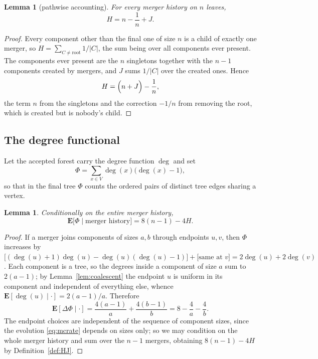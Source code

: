 \documentclass[10pt,a4paper]{amsart}
\newtheorem{lemma}[theorem]{Lemma}
\newcommand{\E}{\mathbf{E}}
\DeclareMathOperator{\dg}{deg}
\begin{document}
\begin{lemma}[pathwise accounting]
\label{lem:HJ}
For every merger history on $n$ leaves,
\[
H=n-\frac1n+J .
\]
\end{lemma}

\begin{proof}
Every component other than the final one of size $n$ is a child of exactly one
merger, so $H=\sum_{C\ne\text{root}}1/|C|$, the sum being over all components
ever present. The components ever present are the $n$ singletons together with
the $n-1$ components created by mergers, and $J$ sums $1/|C|$ over the created
ones. Hence
\[
H=\Bigl(n+J\Bigr)-\frac1n,
\]
the term $n$ from the singletons and the correction $-1/n$ from removing the
root, which is created but is nobody's child.
\end{proof}

\subsection{The degree functional}

Let the accepted forest carry the degree function $\dg$ and set
\[
\Phi=\sum_{x\in V}\dg(x)\bigl(\dg(x)-1\bigr),
\]
so that in the final tree $\Phi$ counts the ordered pairs of distinct tree edges
sharing a vertex.

\begin{lemma}
\label{lem:drift}
Conditionally on the entire merger history,
\begin{equation}
\label{eq:PhiH}
\E\bigl[\Phi\mid \text{merger history}\bigr]=8(n-1)-4H .
\end{equation}
\end{lemma}

\begin{proof}
If a merger joins components of sizes $a,b$ through endpoints $u,v$, then
$\Phi$ increases by
$\bigl[(\dg(u)+1)\dg(u)-\dg(u)(\dg(u)-1)\bigr]+\bigl[\text{same at }v\bigr]
=2\dg(u)+2\dg(v)$. Each component is a tree, so the degrees inside a component of
size $a$ sum to $2(a-1)$; by Lemma~\ref{lem:coalescent} the endpoint $u$ is
uniform in its component and independent of everything else, whence
$\E[\dg(u)\mid\cdot]=2(a-1)/a$. Therefore
\[
\E[\Delta\Phi\mid \cdot]=\frac{4(a-1)}a+\frac{4(b-1)}b=8-\frac4a-\frac4b .
\]
The endpoint choices are independent of the sequence of component sizes, since
the evolution \eqref{eq:mcrate} depends on sizes only; so we may condition on the
whole merger history and sum over the $n-1$ mergers, obtaining
$8(n-1)-4H$ by Definition~\ref{def:HJ}.
\end{proof}
\end{document}

